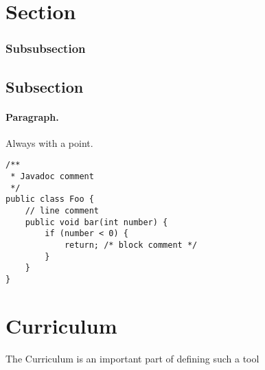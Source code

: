 \documentclass{seal_thesis}
\begin{document}
\section{Section}
%
\subsubsection{Subsubsection}

\subsection{Subsection}
%


\paragraph{Paragraph.} Always with a point.

\begin{lstlisting}[caption=An example code snippet]
/**
 * Javadoc comment
 */
public class Foo {
	// line comment
	public void bar(int number) {
		if (number < 0) {
			return; /* block comment */
		}
	}
}
\end{lstlisting}


\section{Curriculum}

The Curriculum is an important part of defining such a tool 

\backmatter



\end{document}
